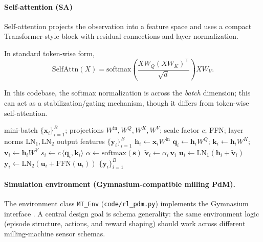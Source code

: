\documentclass[sn-basic]{sn-jnl} %
\begin{document}
\paragraph{Self-attention (SA)}
Self-attention projects the observation into a feature space and uses a compact Transformer-style block with residual connections and layer normalization.

In standard token-wise form,
\begin{equation}
\mathrm{SelfAttn}(X)=\mathrm{softmax}\left(\frac{XW_Q(XW_K)^\top}{\sqrt{d}}\right)XW_V.
\end{equation}

In this codebase, the softmax normalization is across the \emph{batch} dimension; this can act as a stabilization/gating mechanism, though it differs from token-wise self-attention.

\begin{algorithm}[t]
\caption{Self-attention feature extractor (forward pass; batch-normalized gating)}
\label{alg:sa_forward}
\begin{algorithmic}[1]
\Require mini-batch $\{\mathbf{x}_i\}_{i=1}^{B}$; projections $W^{\mathrm{in}},W^Q,W^K,W^V$; scale factor $c$; FFN; layer norms $\mathrm{LN}_1,\mathrm{LN}_2$
\Ensure output features $\{\mathbf{y}_i\}_{i=1}^{B}$
		\State $\mathbf{h}_i \gets \mathbf{x}_i W^{\mathrm{in}}$
		\State $\mathbf{q}_i \gets \mathbf{h}_i W^Q$; $\mathbf{k}_i \gets \mathbf{h}_i W^K$; $\mathbf{v}_i \gets \mathbf{h}_i W^V$
		\State $s_i \gets c\,\langle \mathbf{q}_i,\mathbf{k}_i\rangle$ 
\EndFor
\State $\alpha \gets \mathrm{softmax}(\mathbf{s})$ 
		\State $\tilde{\mathbf{v}}_i \gets \alpha_i\,\mathbf{v}_i$
		\State $\mathbf{u}_i \gets \mathrm{LN}_1(\mathbf{h}_i + \tilde{\mathbf{v}}_i)$
		\State $\mathbf{y}_i \gets \mathrm{LN}_2(\mathbf{u}_i + \mathrm{FFN}(\mathbf{u}_i))$
\EndFor
\State \Return $\{\mathbf{y}_i\}_{i=1}^{B}$
\end{algorithmic}
\end{algorithm}

\paragraph{Simulation environment (Gymnasium-compatible milling PdM).}
The environment class \texttt{MT\_Env} (\texttt{code/rl\_pdm.py}) implements the Gymnasium interface \cite{Foundation2023}. A central design goal is schema generality: the same environment logic (episode structure, actions, and reward shaping) should work across different milling-machine sensor schemas.
\end{document}

